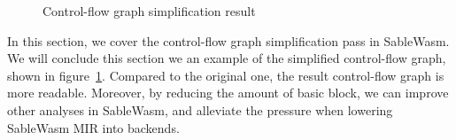 \begin{figure}
    
    \caption{Control-flow graph simplification result}
    \label{fig:simplify-result}
\end{figure}

In this section, we cover the control-flow graph simplification pass in SableWasm. We will conclude this section we an example of the simplified control-flow graph, shown in figure~\ref{fig:simplify-result}. Compared to the original one, the result control-flow graph is more readable. Moreover, by reducing the amount of basic block, we can improve other analyses in SableWasm, and alleviate the pressure when lowering SableWasm MIR into backends.

